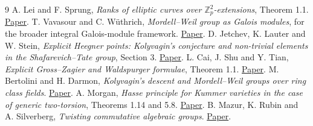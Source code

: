 \documentclass[11pt]{article}
\newcommand{\Z}{\mathbb Z}
\begin{document}
\begin{thebibliography}{9}
 A. Lei and F. Sprung, \emph{Ranks of elliptic curves over
$\Z_p^2$-extensions}, Theorem 1.1.
\href{https://arxiv.org/abs/1809.10127}{Paper}.
 T. Vavasour and C. W\"uthrich, \emph{Mordell--Weil group as
Galois modules}, for the broader integral Galois-module framework.
\href{https://arxiv.org/abs/2306.13365}{Paper}.
 D. Jetchev, K. Lauter and W. Stein, \emph{Explicit Heegner
points: Kolyvagin's conjecture and non-trivial elements in the
Shafarevich--Tate group}, Section 3.
\href{https://arxiv.org/abs/0707.0032}{Paper}.
 L. Cai, J. Shu and Y. Tian, \emph{Explicit Gross--Zagier and
Waldspurger formulae}, Theorem 1.1.
\href{https://msp.org/ant/2014/8-10/ant-v8-n10-p05-p.pdf}{Paper}.
 M. Bertolini and H. Darmon, \emph{Kolyvagin's descent and
Mordell--Weil groups over ring class fields}.
\href{https://www.math.mcgill.ca/darmon/pub/Articles/Research/04.Kolyvagin-descent/paper.pdf}{Paper}.
 A. Morgan, \emph{Hasse principle for Kummer varieties
in the case of generic two-torsion}, Theorems 1.14 and 5.8.
\href{https://doi.org/10.1112/plms.70066}{Paper}.
 B. Mazur, K. Rubin and A. Silverberg, \emph{Twisting commutative
algebraic groups}.
\href{https://arxiv.org/abs/math/0609066}{Paper}.
\end{thebibliography}
\end{document}
